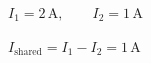 \documentclass[border=12pt]{standalone}
\begin{document}
\color{weeknavy}
\parbox{11cm}{\centering $\displaystyle I_1=2\,\mathrm A,\qquad I_2=1\,\mathrm A$}
\vspace{4pt}
\parbox{11cm}{\centering $\displaystyle I_{\mathrm{shared}}=I_1-I_2=1\,\mathrm A$}
\end{document}

